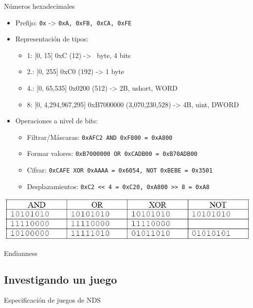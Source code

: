 \begin{frame}{Números hexadecimales}
    \begin{itemize}
        \item Prefijo: \texttt{0x} -> \texttt{0xA, 0xFB, 0xCA, 0xFE}

        \item Representación de tipos:
        \begin{itemize}
            \footnotesize
            \item 1: [0, 15] 0xC (12) -> \textonehalf~byte, 4 bits
            \item 2.: [0, 255] 0xC0 (192) -> 1 byte
            \item 4.: [0, 65,535] 0x0200 (512) -> 2B, ushort, WORD
            \item 8: [0, 4,294,967,295] 0xB7000000 (3,070,230,528) -> 4B, uint, DWORD
        \end{itemize}
        \normalsize

        \item Operaciones a nivel de bits:
        \begin{itemize}
            \footnotesize
            \item Filtrar/Máscaras: \texttt{0xAFC2 AND 0xF800 = 0xA800}
            \item Formar valores: \texttt{0xB7000000 OR 0xCADB00 = 0xB70ADB00}
            \item Cifrar: \texttt{0xCAFE XOR 0xAAAA = 0x6054, NOT 0xBEBE = 0x3501}
            \item Desplazamientos: \texttt{0xC2 << 4 = 0xC20, 0xA800 >> 8 = 0xA8}
        \end{itemize}
    \end{itemize}
    \includegraphics[width=\textwidth]{bitop.png}
\end{frame}


\begin{frame}{Endianness}
\end{frame}

\subsection{Investigando un juego}
\begin{frame}{Especificación de juegos de NDS}
\end{frame}

